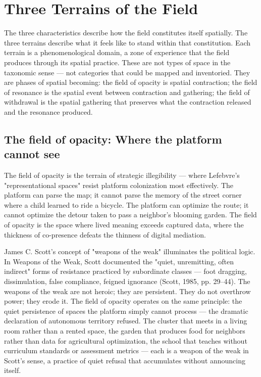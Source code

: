 \section{Three Terrains of the Field}

The three characteristics describe how the field constitutes itself spatially. The three terrains describe what it feels like to stand within that constitution. Each terrain is a phenomenological domain, a zone of experience that the field produces through its spatial practice. These are not types of space in the taxonomic sense — not categories that could be mapped and inventoried. They are phases of spatial becoming: the field of opacity is spatial contraction; the field of resonance is the spatial event between contraction and gathering; the field of withdrawal is the spatial gathering that preserves what the contraction released and the resonance produced.

\subsection{The field of opacity: Where the platform cannot see}

The field of opacity is the terrain of strategic illegibility — where Lefebvre's "representational spaces" resist platform colonization most effectively. The platform can parse the map; it cannot parse the memory of the street corner where a child learned to ride a bicycle. The platform can optimize the route; it cannot optimize the detour taken to pass a neighbor's blooming garden. The field of opacity is the space where lived meaning exceeds captured data, where the thickness of co-presence defeats the thinness of digital mediation.

James C. Scott's concept of "weapons of the weak" illuminates the political logic. In Weapons of the Weak, Scott documented the "quiet, unremitting, often indirect" forms of resistance practiced by subordinate classes — foot dragging, dissimulation, false compliance, feigned ignorance (Scott, 1985, pp. 29–44). The weapons of the weak are not heroic; they are persistent. They do not overthrow power; they erode it. The field of opacity operates on the same principle: the quiet persistence of spaces the platform simply cannot process — the dramatic declaration of autonomous territory refused. The cluster that meets in a living room rather than a rented space, the garden that produces food for neighbors rather than data for agricultural optimization, the school that teaches without curriculum standards or assessment metrics — each is a weapon of the weak in Scott's sense, a practice of quiet refusal that accumulates without announcing itself.

